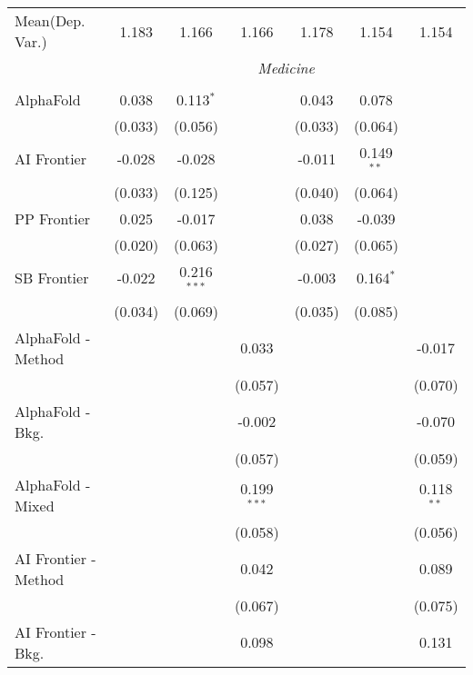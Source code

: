 \begin{tabular}{lcccccc}
Mean(Dep. Var.) & 1.183 & 1.166 & 1.166 & 1.178 & 1.154 & 1.154 \\
 & \multicolumn{6}{c}{\textit{Medicine}} \\ \\
   AlphaFold            & 0.038   & 0.113$^{*}$   &               & 0.043   & 0.078        &   \\   
                        & (0.033) & (0.056)       &               & (0.033) & (0.064)      &   \\   
   AI Frontier          & -0.028  & -0.028        &               & -0.011  & 0.149$^{**}$ &   \\   
                        & (0.033) & (0.125)       &               & (0.040) & (0.064)      &   \\   
   PP Frontier          & 0.025   & -0.017        &               & 0.038   & -0.039       &   \\   
                        & (0.020) & (0.063)       &               & (0.027) & (0.065)      &   \\   
   SB Frontier          & -0.022  & 0.216$^{***}$ &               & -0.003  & 0.164$^{*}$  &   \\   
                        & (0.034) & (0.069)       &               & (0.035) & (0.085)      &   \\   
   AlphaFold - Method   &         &               & 0.033         &         &              & -0.017\\   
                        &         &               & (0.057)       &         &              & (0.070)\\   
   AlphaFold - Bkg.     &         &               & -0.002        &         &              & -0.070\\   
                        &         &               & (0.057)       &         &              & (0.059)\\   
   AlphaFold - Mixed    &         &               & 0.199$^{***}$ &         &              & 0.118$^{**}$\\   
                        &         &               & (0.058)       &         &              & (0.056)\\   
   AI Frontier - Method &         &               & 0.042         &         &              & 0.089\\   
                        &         &               & (0.067)       &         &              & (0.075)\\   
   AI Frontier - Bkg.   &         &               & 0.098         &         &              & 0.131\\   

\end{tabular}

